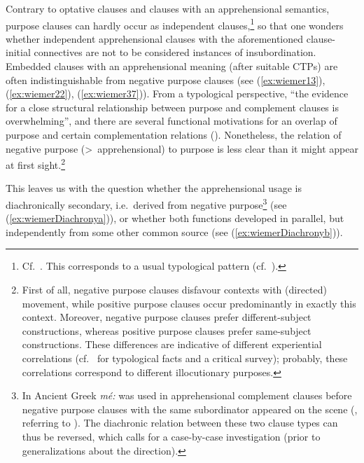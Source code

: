 \documentclass[output=paper,colorlinks,citecolor=brown]{langscibook}
\begin{document}
 Contrary to optative clauses and clauses with an apprehensional semantics, purpose clauses can hardly occur as independent clauses,\footnote{Cf.\ \citet[271--272]{Dobrushina2016}. This corresponds to a usual typological pattern \mbox{(cf.\ \citealt[150--151]{Schmidtke-Bode2009}).}} so that one wonders whether independent apprehensional clauses with the aforementioned clause-initial connectives are not to be considered instances of insubordination. Embedded clauses with an apprehensional meaning (after suitable CTPs) are often indistinguishable from negative purpose clauses (see (\ref{ex:wiemer13}), (\ref{ex:wiemer22}), (\ref{ex:wiemer37})). From a typological perspective, ``the evidence for a close structural relationship between purpose and complement clauses is overwhelming'', and there are several functional motivations for an overlap of purpose and certain complementation relations (\citealt[161, 164]{Schmidtke-Bode2009}). Nonetheless, the relation of negative purpose (>~apprehensional) to purpose is less clear than it might appear at first sight.\footnote{First of all, negative purpose clauses disfavour contexts with (directed) movement, while positive purpose clauses occur predominantly in exactly this context. Moreover, negative purpose clauses prefer different-subject constructions, whereas positive purpose clauses prefer same-subject constructions. These differences are indicative of different experiential correlations (cf.\ \citealt[129--144]{Schmidtke-Bode2009} for typological facts and a critical survey); probably, these correlations correspond to different illocutionary purposes.}


This leaves us with the question whether the apprehensional usage is diachronically secondary, i.e.\ derived from negative purpose\footnote{In Ancient Greek \textit{mé:} was used in apprehensional complement clauses before negative purpose clauses with the same subordinator appeared on the scene (\citealt[142--143]{dobrushina2021}, referring to \citealt{Goodwin1897}). The diachronic relation between these two clause types can thus be reversed, which calls for a case-by-case investigation (prior to generalizations about the direction).} (see (\ref{ex:wiemerDiachronya})), or whether both functions developed in parallel, but independently from some other common source (see (\ref{ex:wiemerDiachronyb})).
\end{document}
